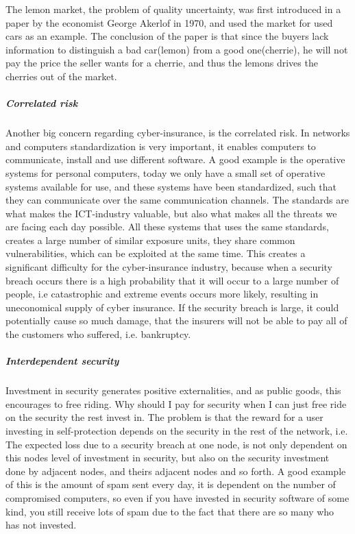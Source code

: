       The lemon market, the problem of quality uncertainty, was first introduced in a paper \cite{lemonpaper} by the economist George Akerlof in 1970,
       and used the market for used cars as an example.\cite{lemon} The conclusion of the paper is
        that since the buyers lack information to distinguish a bad car(lemon) from a good
         one(cherrie), he will not pay the price the seller wants for a cherrie,
          and thus the lemons drives the cherries out of the market. 
\subparagraph{Correlated risk}

Another big concern regarding cyber-insurance, is the correlated risk. In networks and computers
 standardization is very important, it enables computers to communicate, 
 install and use different software. A good example is the operative systems for personal computers,
  today we only have a small set of operative systems available for use, and these systems have been
   standardized, such that they can communicate over the same communication channels. The standards are what makes the ICT-industry valuable, 
   but also what makes all the threats we are facing each day possible. 
   All these systems that uses the same standards, creates a large number of similar exposure units,
    they share common vulnerabilities, which can be exploited at the same time. 
This creates a significant difficulty for the cyber-insurance industry, because
when a security breach occurs there is a high probability that it will occur to a large number of people, i.e catastrophic and extreme events occurs more likely, resulting in uneconomical supply of cyber insurance.
If the security breach is large, it could potentially cause so much damage, that the insurers will not be able to pay all of the customers who suffered, i.e. bankruptcy.\cite{bohme2010modeling} 
\subparagraph{Interdependent security}
Investment in security generates positive externalities, and as public goods, this encourages to free riding. Why should I pay for security when I can just free ride on the security the rest invest in.  The problem is that the reward for a user investing in self-protection depends on the security in the rest of the network, i.e. The expected loss due to a security breach at one node, is not only
dependent on this nodes level of investment in security, but also on the security investment done
  by adjacent nodes, and theirs adjacent nodes and so forth. 
  A good example of this is the amount of spam sent every day, it is dependent on the number of compromised computers, so even if you have invested in security software of some kind, you still receive lots of spam due to the fact that there are so many who has not invested. 
  \cite{towardsInsurable}


